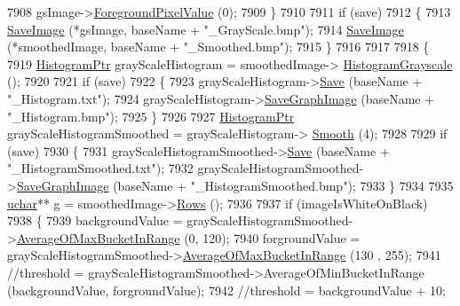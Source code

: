 \begin{DoxyCode}
7908     gsImage->\hyperlink{class_k_k_b_1_1_raster_a11b142b955f79a1482606a32ce209373}{ForegroundPixelValue} (0);
7909   \}
7910 
7911   \textcolor{keywordflow}{if}  (save)
7912   \{
7913     \hyperlink{namespace_k_k_b_a79418a91c1f41864f9b0047aa01b52bc}{SaveImage} (*gsImage, baseName + \textcolor{stringliteral}{"\_GrayScale.bmp"});
7914     \hyperlink{namespace_k_k_b_a79418a91c1f41864f9b0047aa01b52bc}{SaveImage} (*smoothedImage, baseName + \textcolor{stringliteral}{"\_Smoothed.bmp"});
7915   \}
7916 
7917 
7918   \{
7919     \hyperlink{class_k_k_b_1_1_histogram}{HistogramPtr}  grayScaleHistogram = smoothedImage->
      \hyperlink{class_k_k_b_1_1_raster_a58cbc4c1368e65cd9d3ce7ee2a919179}{HistogramGrayscale} ();
7920 
7921     \textcolor{keywordflow}{if}  (save)
7922     \{
7923       grayScaleHistogram->\hyperlink{class_k_k_b_1_1_histogram_ad875d4652f38d49d9c2fd170afee0071}{Save}           (baseName + \textcolor{stringliteral}{"\_Histogram.txt"});
7924       grayScaleHistogram->\hyperlink{class_k_k_b_1_1_histogram_a0638645f1b64aa0128b3af42360360e7}{SaveGraphImage} (baseName + \textcolor{stringliteral}{"\_Histogram.bmp"});
7925     \}
7926 
7927     \hyperlink{class_k_k_b_1_1_histogram}{HistogramPtr}  grayScaleHistogramSmoothed = grayScaleHistogram->
      \hyperlink{class_k_k_b_1_1_histogram_a3377c8afecd84c378025ef38e4a1d4ad}{Smooth} (4);
7928 
7929     \textcolor{keywordflow}{if}  (save)
7930     \{
7931       grayScaleHistogramSmoothed->\hyperlink{class_k_k_b_1_1_histogram_ad875d4652f38d49d9c2fd170afee0071}{Save}           (baseName + \textcolor{stringliteral}{"\_HistogramSmoothed.txt"});
7932       grayScaleHistogramSmoothed->\hyperlink{class_k_k_b_1_1_histogram_a0638645f1b64aa0128b3af42360360e7}{SaveGraphImage} (baseName + \textcolor{stringliteral}{"\_HistogramSmoothed.bmp"});
7933     \}
7934 
7935     \hyperlink{namespace_k_k_b_ace9969169bf514f9ee6185186949cdf7}{uchar}**  g = smoothedImage->\hyperlink{class_k_k_b_1_1_raster_a2460989f656e5222d6074cd0ba85ed72}{Rows} ();
7936 
7937     \textcolor{keywordflow}{if}  (imageIsWhiteOnBlack)
7938     \{
7939       backgroundValue = grayScaleHistogramSmoothed->\hyperlink{class_k_k_b_1_1_histogram_ac0d1890f4e8826a2f7a217ecfbf76c59}{AverageOfMaxBucketInRange} (0, 
      120);
7940       forgroundValue  = grayScaleHistogramSmoothed->\hyperlink{class_k_k_b_1_1_histogram_ac0d1890f4e8826a2f7a217ecfbf76c59}{AverageOfMaxBucketInRange} (130
      , 255);
7941       \textcolor{comment}{//threshold = grayScaleHistogramSmoothed->AverageOfMinBucketInRange (backgroundValue,
       forgroundValue);}
7942       \textcolor{comment}{//threshold = backgroundValue + 10;}

\end{DoxyCode}
